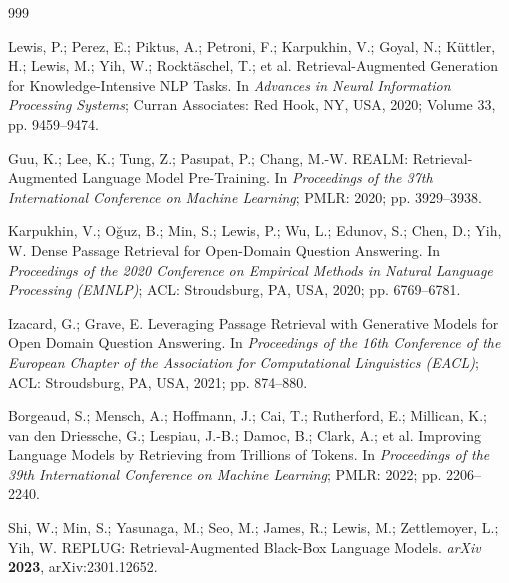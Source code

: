
\begin{thebibliography}{999}


Lewis, P.; Perez, E.; Piktus, A.; Petroni, F.; Karpukhin, V.; Goyal, N.; K\"uttler, H.;
Lewis, M.; Yih, W.; Rockt\"aschel, T.; et al. Retrieval-Augmented Generation for
Knowledge-Intensive NLP Tasks. In \textit{Advances in Neural Information Processing Systems};
Curran Associates: Red Hook, NY, USA, 2020; Volume 33, pp. 9459--9474.

Guu, K.; Lee, K.; Tung, Z.; Pasupat, P.; Chang, M.-W. REALM: Retrieval-Augmented Language Model
Pre-Training. In \textit{Proceedings of the 37th International Conference on Machine Learning};
PMLR: 2020; pp. 3929--3938.

Karpukhin, V.; O\u{g}uz, B.; Min, S.; Lewis, P.; Wu, L.; Edunov, S.; Chen, D.; Yih, W. Dense
Passage Retrieval for Open-Domain Question Answering. In \textit{Proceedings of the 2020
Conference on Empirical Methods in Natural Language Processing (EMNLP)}; ACL: Stroudsburg, PA,
USA, 2020; pp. 6769--6781.

Izacard, G.; Grave, E. Leveraging Passage Retrieval with Generative Models for Open Domain
Question Answering. In \textit{Proceedings of the 16th Conference of the European Chapter of
the Association for Computational Linguistics (EACL)}; ACL: Stroudsburg, PA, USA, 2021;
pp. 874--880.

Borgeaud, S.; Mensch, A.; Hoffmann, J.; Cai, T.; Rutherford, E.; Millican, K.; van den Driessche,
G.; Lespiau, J.-B.; Damoc, B.; Clark, A.; et al. Improving Language Models by Retrieving from
Trillions of Tokens. In \textit{Proceedings of the 39th International Conference on Machine
Learning}; PMLR: 2022; pp. 2206--2240.

Shi, W.; Min, S.; Yasunaga, M.; Seo, M.; James, R.; Lewis, M.; Zettlemoyer, L.; Yih, W. REPLUG:
Retrieval-Augmented Black-Box Language Models. \textit{arXiv} \textbf{2023}, arXiv:2301.12652.


\end{thebibliography}
